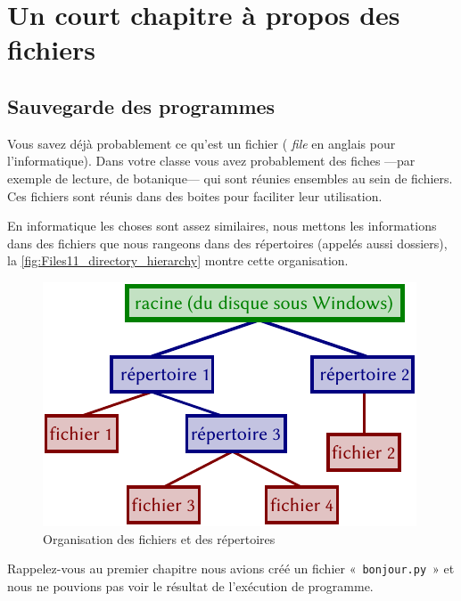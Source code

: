 



\chapter{Un court chapitre à propos des fichiers}
\section{Sauvegarde des programmes}

Vous savez déjà probablement ce qu'est un fichier ( \emph{file} en anglais pour l'informatique).
Dans votre classe vous avez probablement des fiches ---par exemple de lecture, de botanique--- qui sont réunies ensembles au sein de fichiers. Ces fichiers sont réunis dans des boites pour faciliter leur utilisation.

En informatique les choses sont assez similaires, nous mettons les informations dans des fichiers que nous rangeons dans des répertoires (appelés aussi dossiers), la \autoref{fig:Files11_directory_hierarchy} montre cette organisation.

\begin{figure}[h!]
\centering
\includegraphics[scale=1]{images/Files11_directory_hierarchy.pdf}
\caption{Organisation des fichiers et des répertoires}\label{fig:Files11_directory_hierarchy}
\end{figure}


Rappelez-vous au premier chapitre nous avions créé un fichier «~\texttt{bonjour.py}~» et nous ne pouvions pas voir le résultat de l'exécution de programme.

